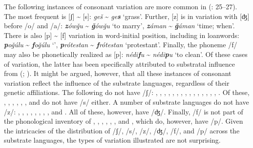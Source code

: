\documentclass[output=paper]{langsci/langscibook}
\begin{document}
  The following instances of consonant variation are more common in   (\citealt{Manfredi2017}: 25–27). The most frequent is [ʃ] {\textasciitilde} [s]: \textit{geš} {\textasciitilde} \textit{ge\textbf{s}} ‘grass’. Further, [z] is in variation with [ʤ] before /o/ and /a/: \textit{\textbf{z}ówǧu} {\textasciitilde} \textit{\textbf{ǧ}ówǧu} ‘to marry’, \textit{\textbf{z}áman} {\textasciitilde} \textit{\textbf{ǧ}áman} ‘time; when’. There is also [p] {\textasciitilde} [f] variation in word-initial position, including in {loanwords}: \textit{\textbf{p}oǧúlu} {\textasciitilde} \textit{\textbf{f}oǧúlu} ‘’, \textit{\textbf{p}rótestan} {\textasciitilde} \textit{\textbf{f}rótestan} ‘protestant’. Finally, the {phoneme} /f/ may also be phonetically realized as [p]: \textit{nédi\textbf{f}u} {\textasciitilde} \textit{nédi\textbf{p}u} ‘to clean’. Of these cases of variation, the latter has been specifically attributed to substratal influence from  (\citealt{Miller1989}; \citealt{Manfredi2017}). It might be argued, however, that all these instances of consonant variation reflect the influence of the {substrate} languages, regardless of their genetic affiliations. The following do not have /ʃ/: , , , , , , , , , , , , , , , . Of these, , , , , , ,  and  do not have /s/ either. A number of {substrate} languages do not have /z/: , , , , , , , , and . All of these, however, have /ʤ/. Finally, /f/ is not part of the phonological inventory of , , , , , , and , which do, however, have /p/. Given the intricacies of the distribution of /ʃ/, /s/, /z/, /ʤ/, /f/, and /p/ across the {substrate} languages, the types of variation illustrated are not surprising. 
\end{document}
